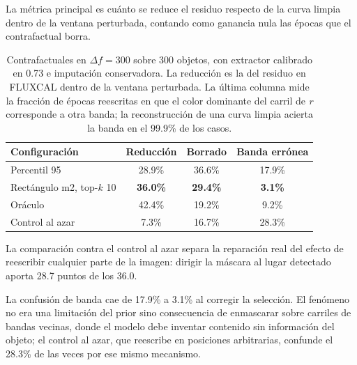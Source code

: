 La métrica principal es cuánto se reduce el residuo respecto de la curva limpia dentro de la ventana perturbada, contando como ganancia nula las épocas que el contrafactual borra.

\begin{table}[H]
\centering
\begin{tabular}{|l|c|c|c|}
\hline
\textbf{Configuración} & \textbf{Reducción} & \textbf{Borrado} & \textbf{Banda errónea} \\
\hline
Percentil 95              & 28.9\% & 36.6\% & 17.9\% \\
Rectángulo m2, top-$k$ 10 & \textbf{36.0\%} & \textbf{29.4\%} & \textbf{3.1\%} \\
Oráculo                   & 42.4\% & 19.2\% & 9.2\% \\
Control al azar           & 7.3\%  & 16.7\% & 28.3\% \\
\hline
\end{tabular}
\caption{Contrafactuales en $\Delta f = 300$ sobre 300 objetos, con extractor calibrado en 0.73 e imputación conservadora. La reducción es la del residuo en FLUXCAL dentro de la ventana perturbada. La última columna mide la fracción de épocas reescritas en que el color dominante del carril de \textit{r} corresponde a otra banda; la reconstrucción de una curva limpia acierta la banda en el 99.9\% de los casos.}
\label{tab:contrafactual_flujo}
\end{table}

\begin{figure}[H]
\centering
{}
\end{figure}

La comparación contra el control al azar separa la reparación real del efecto de reescribir cualquier parte de la imagen: dirigir la máscara al lugar detectado aporta 28.7 puntos de los 36.0.

La confusión de banda cae de 17.9\% a 3.1\% al corregir la selección. El fenómeno no era una limitación del prior sino consecuencia de enmascarar sobre carriles de bandas vecinas, donde el modelo debe inventar contenido sin información del objeto; el control al azar, que reescribe en posiciones arbitrarias, confunde el 28.3\% de las veces por ese mismo mecanismo.

